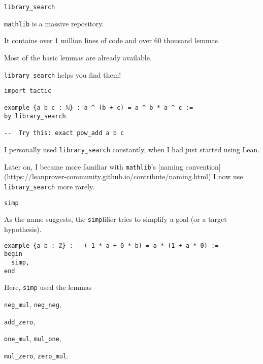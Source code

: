 \documentclass{beamer}
\begin{document}
\begin{frame}[fragile]{{\texttt{library\_search}}}

{\verb`mathlib`} is a massive repository.

It contains over 1 million lines of code and over 60 thousand lemmas.

Most of the basic{\footnotemark} lemmas are already available.

{\verb`library_search`} helps you find them!

\begin{verbatim}
import tactic

example {a b c : ℕ} : a ^ (b + c) = a ^ b * a ^ c :=
by library_search

--  Try this: exact pow_add a b c
\end{verbatim}

\end{frame}

\begin{frame}[fragile]

I personally used {\verb`library_search`} constantly, when I had just started using Lean.

Later on, I became more familiar with {\verb`mathlib`}'s [naming convention](https://leanprover-community.github.io/contribute/naming.html) I now use {\verb`library_search`} more rarely.
\end{frame}

\begin{frame}[fragile]{{\texttt{simp}}}

As the name suggests, the {\verb`simp`}lifier tries to simplify a goal (or a target hypothesis).

\begin{verbatim}
example {a b : ℤ} : - (-1 * a + 0 * b) = a * (1 + a * 0) :=
begin
  simp,
end
\end{verbatim}
Here, {\verb`simp`} used the lemmas

{\verb`neg_mul`}, {\verb`neg_neg`},

{\verb`add_zero`},

{\verb`one_mul`}, {\verb`mul_one`},

{\verb`mul_zero`}, {\verb`zero_mul`}.
\end{frame}
\end{document}
